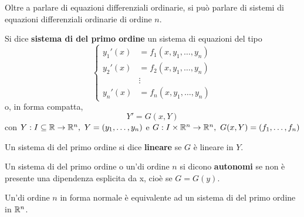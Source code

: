 Oltre a parlare di equazioni differenziali ordinarie, si può parlare di sistemi di equazioni differenziali ordinarie di ordine $n$.
\begin{definition} \label{Def: Sistema di ode del primo ordine}
    Si dice \textbf{sistema di \odes del primo ordine} un sistema di equazioni del tipo
    \begin{equation*}
        \left\{
        \begin{aligned}
        y_1'(x) &= f_1(x, y_1, \dots, y_n)\\
         y_2'(x) &= f_2(x, y_1, \dots, y_n)\\       
        &\vdots \\
        y_n'(x) &= f_n(x, y_1, \dots, y_n)
        \end{aligned} \right.
\end{equation*}
o, in forma compatta, 
\begin{equation*}
    Y'=G(x, Y)
\end{equation*}
con $Y: I \subseteq \mathbb{R} \to \mathbb{R}^n,\ Y=(y_1, \dots, y_n)$ e $G:I \times \mathbb{R}^n \to \mathbb{R}^n,\ G(x, Y)=(f_1, \dots, f_n)$
\end{definition}
\begin{definition} \label{Def: Sistema di ode lineare}
    Un sistema di \odes del primo ordine si dice \textbf{lineare} se $G$ è lineare in $Y$.
\end{definition}
\begin{definition} \label{Def: Sistema/Ode autonoma}
    Un sistema di \odes del primo ordine o un'\ode di ordine $n$ si dicono \textbf{autonomi} se non è presente una dipendenza esplicita da x, cioè se $G=G(y)$.
\end{definition}
\begin{lemma} \label{Lemma: Equivalenza equazione-sistema}
    Un'\ode di ordine $n$ in forma normale è equivalente ad un sistema di \odes del primo ordine in $\mathbb{R}^n$.
\end{lemma}
